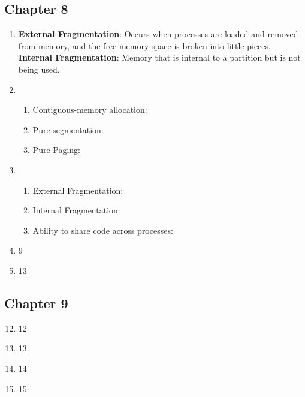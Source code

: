 \documentclass{article}
\begin{document}
\subsection*{Chapter 8}
\begin{enumerate}
\setcounter{enumi}{0}
\item \textbf{External Fragmentation}: Occurs when processes are loaded and removed from memory, and the free memory space is broken into little pieces. \textbf{Internal Fragmentation}: Memory that is internal to a partition but is not being used.
\setcounter{enumi}{3}
\item
  \begin{enumerate}
    \item Contiguous-memory allocation:
    \item Pure segmentation:
    \item Pure Paging:
  \end{enumerate}
\setcounter{enumi}{4}
\item \begin{enumerate}
    \item External Fragmentation:
    \item Internal Fragmentation:
    \item Ability to share code across processes:
  \end{enumerate}
\setcounter{enumi}{8}
\item 9
\setcounter{enumi}{12}
\item 13
\end{enumerate}

\subsection*{Chapter 9}
\begin{enumerate}
\setcounter{enumi}{11}
\item 12
\item 13
\item 14
\item 15
\end{enumerate}
\end{document}
